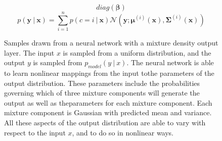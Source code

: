   \begin{equation} \tag{6.34}
    \label{eq_6_34}
    diag(\bm{\beta})
  \end{equation}
  \begin{equation} \tag{6.35}
    \label{eq_6_35}
    p( \bm{y}\ |\ \bm{x} ) =
      \sum ^ n _ {i=1} p( c=i\ |\ \bm{x} )
      \mathcal{N}( \bm{y}; \bm{\mu} ^ {(i)} (\bm{x}), \bm{\Sigma} ^ {(i)} (\bm{x}) )
  \end{equation}

  \setcounter{figure}{3}
  \begin{figure}[ht]
    \begin{center}
      \caption{Samples drawn from a neural network with a mixture density output layer.
	The input $x$ is sampled from a uniform distribution,
	and the output $y$ is sampled from $p _ {model} (y\ |\ x)$.
	The neural network is able to learn nonlinear mappings from the input tothe parameters of the output distribution.
        These parameters include the probabilities governing which of three mixture components will generate the output as well as theparameters for each mixture component.
        Each mixture component is Gaussian with predicted mean and variance.
        All these aspects of the output distribution are able to vary with respect to the input $x$,
        and to do so in nonlinear ways.}\label{fig:NN_mixture_density_output_layer}
    \end{center}
  \end{figure}
